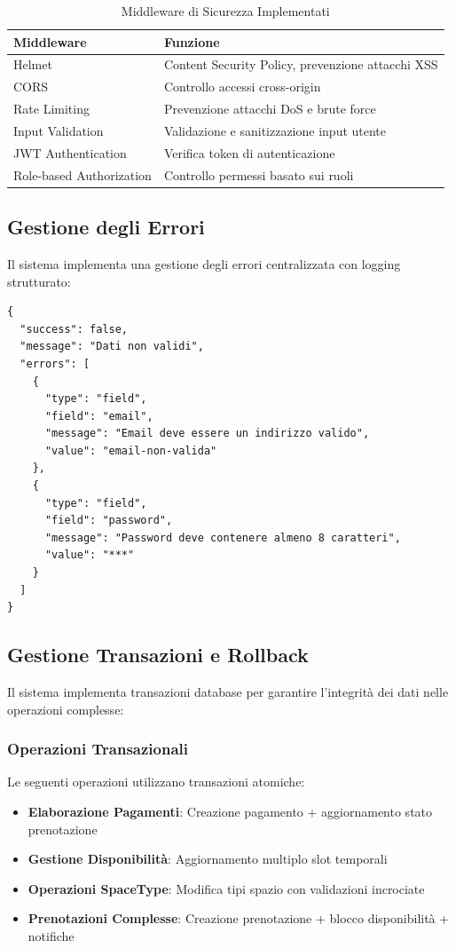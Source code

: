 \begin{table}[H]
\centering
\begin{tabular}{@{}lp{10cm}@{}}
\toprule
\textbf{Middleware} & \textbf{Funzione} \\
\midrule
Helmet & Content Security Policy, prevenzione attacchi XSS \\
CORS & Controllo accessi cross-origin \\
Rate Limiting & Prevenzione attacchi DoS e brute force \\
Input Validation & Validazione e sanitizzazione input utente \\
JWT Authentication & Verifica token di autenticazione \\
Role-based Authorization & Controllo permessi basato sui ruoli \\
\bottomrule
\end{tabular}
\caption{Middleware di Sicurezza Implementati}
\end{table}

\subsection{Gestione degli Errori}
Il sistema implementa una gestione degli errori centralizzata con logging strutturato:

\begin{lstlisting}[caption=Esempio Gestione Errore di Validazione]
{
  "success": false,
  "message": "Dati non validi",
  "errors": [
    {
      "type": "field",
      "field": "email",
      "message": "Email deve essere un indirizzo valido",
      "value": "email-non-valida"
    },
    {
      "type": "field", 
      "field": "password",
      "message": "Password deve contenere almeno 8 caratteri",
      "value": "***"
    }
  ]
}
\end{lstlisting}

\subsection{Gestione Transazioni e Rollback}
Il sistema implementa transazioni database per garantire l'integrità dei dati nelle operazioni complesse:

\subsubsection{Operazioni Transazionali}
Le seguenti operazioni utilizzano transazioni atomiche:

\begin{itemize}
\item \textbf{Elaborazione Pagamenti}: Creazione pagamento + aggiornamento stato prenotazione
\item \textbf{Gestione Disponibilità}: Aggiornamento multiplo slot temporali
\item \textbf{Operazioni SpaceType}: Modifica tipi spazio con validazioni incrociate
\item \textbf{Prenotazioni Complesse}: Creazione prenotazione + blocco disponibilità + notifiche
\end{itemize}

